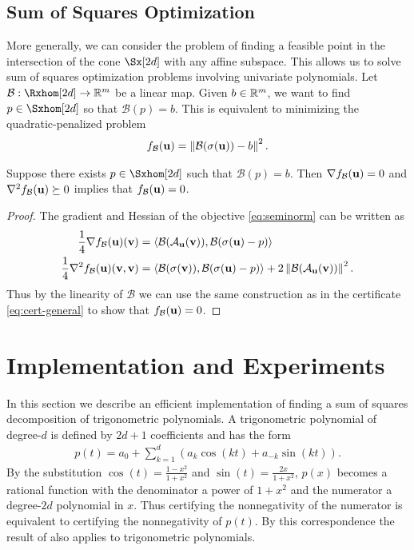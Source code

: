 \documentclass[final,onefignum,onetabnum]{siamart220329}
\begin{document}
\subsection{Sum of Squares Optimization}
More generally, we can consider the problem of finding a feasible point in the
intersection of the cone $\Sx[2d]$ with any affine subspace. This allows us to
solve sum of squares optimization problems involving univariate polynomials. Let
$\mathcal{B} : \Rxhom[2d] \rightarrow \R^m$ be a linear map. Given $b \in \mathbb{R}^m$,
we want to find $p \in \Sxhom[2d]$ so that $\mathcal{B}(p) = b$. This is
equivalent to minimizing the quadratic-penalized problem
\begin{align} \label{eq:seminorm}
  f_{\mathcal{B}}(\boldsymbol{\mathbf{u}}) = \left\lVert \mathcal{B}(\sigma(\boldsymbol{\mathbf{u}})) - b \right\lVert^2.
\end{align}
\begin{corollary} \label{cor:sos-opt}
  Suppose there exists $p \in \Sxhom[2d]$ such that $\mathcal{B}(p) = b$. Then
  $\nabla f_{\mathcal{B}}(\boldsymbol{\mathbf{u}}) = 0$ and
  $\nabla^2 f_{\mathcal{B}}(\boldsymbol{\mathbf{u}}) \succeq 0$ implies that
  $f_{\mathcal{B}}(\boldsymbol{\mathbf{u}}) = 0$.
\end{corollary}
\begin{proof}
  The gradient and Hessian of the objective \eqref{eq:seminorm} can be written
  as
  \begin{align*}
    \frac{1}{4} \nabla f_{\mathcal{B}}(\boldsymbol{\mathbf{u}})(\boldsymbol{\mathbf{v}})
    &= \left\langle \mathcal{B}(\mathcal{A}_{\boldsymbol{\mathbf{u}}}(\boldsymbol{\mathbf{v}})), \mathcal{B}(\sigma(\boldsymbol{\mathbf{u}}) - p) \right\rangle \\
    \frac{1}{4} \nabla^2 f_{\mathcal{B}}(\boldsymbol{\mathbf{u}})(\boldsymbol{\mathbf{v}}, \boldsymbol{\mathbf{v}})
    &= \left\langle \mathcal{B}(\sigma(\boldsymbol{\mathbf{v}})), \mathcal{B}(\sigma(\boldsymbol{\mathbf{u}}) - p) \right\rangle
      + 2\left\lVert \mathcal{B}(\mathcal{A}_{\boldsymbol{\mathbf{u}}}(\boldsymbol{\mathbf{v}})) \right\lVert^2.
  \end{align*}
  Thus by the linearity of $\mathcal{B}$ we can use the same construction as in
  the certificate \eqref{eq:cert-general} to show that
  $f_{\mathcal{B}}(\boldsymbol{\mathbf{u}}) = 0$.
\end{proof}

\section{Implementation and Experiments}
\label{sec:experiments}
In this section we describe an efficient implementation of finding a sum of
squares decomposition of trigonometric polynomials. A trigonometric polynomial
of degree-$d$ is defined by $2d+1$ coefficients and has the form
\begin{align*}
  p(t) = a_0 + \sum_{k=1}^d (a_k \cos(kt) + a_{-k} \sin(kt)).
\end{align*}
By the substitution $\cos(t) = \frac{1-x^2}{1+x^2}$ and
$\sin(t) = \frac{2x}{1+x^2}$, $p(x)$ becomes a rational function with the
denominator a power of $1+x^2$ and the numerator a degree-$2d$ polynomial in
$x$. Thus certifying the nonnegativity of the numerator is equivalent to
certifying the nonnegativity of $p(t)$. By this correspondence the result of
 also applies to trigonometric polynomials.
\end{document}
